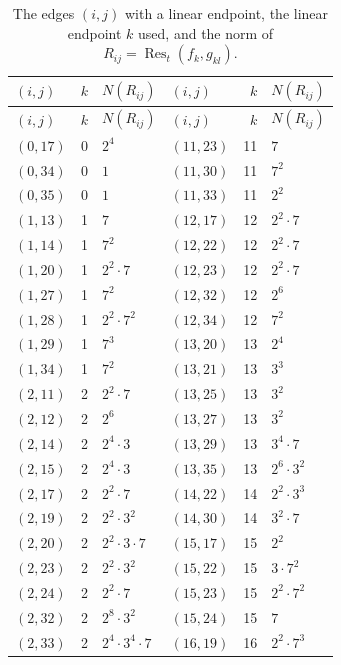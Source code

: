 \documentclass[11pt]{article}
\begin{document}
\begingroup\small
\setlength{\LTcapwidth}{\textwidth}
\begin{longtable}{@{}lrl@{\qquad}lrl@{}}
\caption{The edges $(i,j)$ with a linear endpoint, the linear endpoint $k$ used, and the norm of $R_{ij}=\operatorname{Res}_t(f_k,g_{kl})$.}\label{tab:csep}\\
\hline $(i,j)$ & $k$ & $N(R_{ij})$ & $(i,j)$ & $k$ & $N(R_{ij})$\\\hline\endfirsthead\hline $(i,j)$ & $k$ & $N(R_{ij})$ & $(i,j)$ & $k$ & $N(R_{ij})$\\\hline\endhead\hline\endfoot
$(0,17)$ & 0 & $2^{4}$ & $(11,23)$ & 11 & $7$\\
$(0,34)$ & 0 & $1$ & $(11,30)$ & 11 & $7^{2}$\\
$(0,35)$ & 0 & $1$ & $(11,33)$ & 11 & $2^{2}$\\
$(1,13)$ & 1 & $7$ & $(12,17)$ & 12 & $2^{2}\cdot 7$\\
$(1,14)$ & 1 & $7^{2}$ & $(12,22)$ & 12 & $2^{2}\cdot 7$\\
$(1,20)$ & 1 & $2^{2}\cdot 7$ & $(12,23)$ & 12 & $2^{2}\cdot 7$\\
$(1,27)$ & 1 & $7^{2}$ & $(12,32)$ & 12 & $2^{6}$\\
$(1,28)$ & 1 & $2^{2}\cdot 7^{2}$ & $(12,34)$ & 12 & $7^{2}$\\
$(1,29)$ & 1 & $7^{3}$ & $(13,20)$ & 13 & $2^{4}$\\
$(1,34)$ & 1 & $7^{2}$ & $(13,21)$ & 13 & $3^{3}$\\
$(2,11)$ & 2 & $2^{2}\cdot 7$ & $(13,25)$ & 13 & $3^{2}$\\
$(2,12)$ & 2 & $2^{6}$ & $(13,27)$ & 13 & $3^{2}$\\
$(2,14)$ & 2 & $2^{4}\cdot 3$ & $(13,29)$ & 13 & $3^{4}\cdot 7$\\
$(2,15)$ & 2 & $2^{4}\cdot 3$ & $(13,35)$ & 13 & $2^{6}\cdot 3^{2}$\\
$(2,17)$ & 2 & $2^{2}\cdot 7$ & $(14,22)$ & 14 & $2^{2}\cdot 3^{3}$\\
$(2,19)$ & 2 & $2^{2}\cdot 3^{2}$ & $(14,30)$ & 14 & $3^{2}\cdot 7$\\
$(2,20)$ & 2 & $2^{2}\cdot 3\cdot 7$ & $(15,17)$ & 15 & $2^{2}$\\
$(2,23)$ & 2 & $2^{2}\cdot 3^{2}$ & $(15,22)$ & 15 & $3\cdot 7^{2}$\\
$(2,24)$ & 2 & $2^{2}\cdot 7$ & $(15,23)$ & 15 & $2^{2}\cdot 7^{2}$\\
$(2,32)$ & 2 & $2^{8}\cdot 3^{2}$ & $(15,24)$ & 15 & $7$\\
$(2,33)$ & 2 & $2^{4}\cdot 3^{4}\cdot 7$ & $(16,19)$ & 16 & $2^{2}\cdot 7^{3}$\\

\end{longtable}
\end{document}
